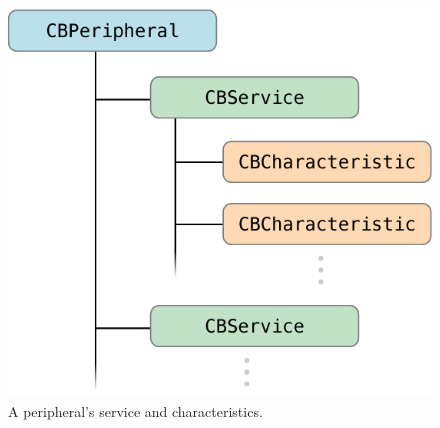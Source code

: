 \documentclass{lab}
\begin{document}
\begin{figure}[h]
    \begin{center}
    \includegraphics[height=0.25\textheight]{images/TreeOfServicesAndCharacteristics.png} 
    \caption{A peripheral’s service and characteristics.}
    \end{center}
\end{figure}
\end{document}
